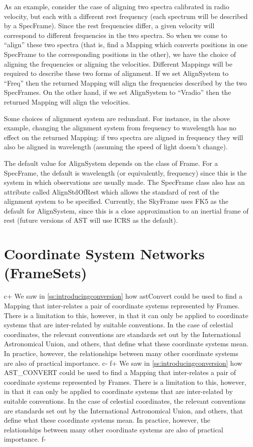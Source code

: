 \documentclass[twoside,11pt]{article}
\newcommand{\secref}[1]{\S\ref{#1}}
\renewcommand{\secref}[1]{\ref{#1}}
\begin{document}
As an example, consider the case of aligning two spectra calibrated in
radio velocity, but each with a different rest frequency (each spectrum
will be described by a SpecFrame). Since the rest frequencies differ, a
given velocity will correspond to different frequencies in the two
spectra. So when we come to ``align'' these two spectra (that is, find a
Mapping which converts positions in one SpecFrame to the corresponding
positions in the other), we have the choice of aligning the frequencies
or aligning the velocities. Different Mappings will be required to
describe these two forms of alignment. If we set AlignSystem to ``Freq''
then the returned Mapping will align the frequencies described by the two
SpecFrames. On the other hand, if we set AlignSystem to ``Vradio''
then the returned Mapping will align the velocities.

Some choices of alignment system are redundant. For instance, in the
above example, changing the alignment system from frequency to wavelength
has no effect on the returned Mapping: if two spectra are aligned in
frequency they will also be aligned in wavelength (assuming the speed of
light doesn't change).

The default value for AlignSystem depends on the class of Frame. For a
SpecFrame, the default is wavelength (or equivalently, frequency)
since this is the system in which observations are usually made. The
SpecFrame class also has an attribute called AlignStdOfRest which
allows the standard of rest of the alignment system to be specified.
Currently, the SkyFrame uses FK5 as the default for AlignSystem, since
this is a close approximation to an inertial frame of rest (future
versions of AST will use ICRS as the default).

\cleardoublepage
\section{\label{ss:framesets}Coordinate System Networks (FrameSets)}

c+
We saw in \secref{ss:introducingconversion} how astConvert could be
used to find a Mapping that inter-relates a pair of coordinate systems
represented by Frames. There is a limitation to this, however, in that
it can only be applied to coordinate systems that are inter-related by
suitable conventions. In the case of celestial coordinates, the
relevant conventions are standards set out by the International
Astronomical Union, and others, that define what these coordinate
systems mean. In practice, however, the relationships between many
other coordinate systems are also of practical importance.
c-
f+
We saw in \secref{ss:introducingconversion} how AST\_CONVERT could be
used to find a Mapping that inter-relates a pair of coordinate systems
represented by Frames. There is a limitation to this, however, in that
it can only be applied to coordinate systems that are inter-related by
suitable conventions. In the case of celestial coordinates, the
relevant conventions are standards set out by the International
Astronomical Union, and others, that define what these coordinate
systems mean. In practice, however, the relationships between many
other coordinate systems are also of practical importance.
f-
\end{document}
